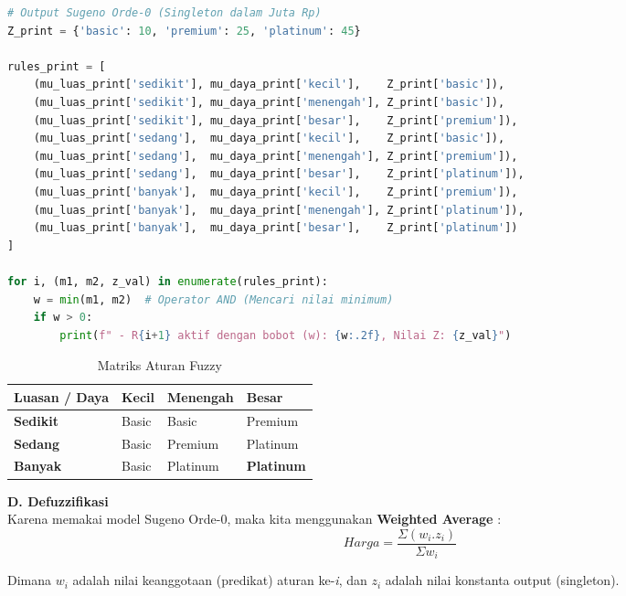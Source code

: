 \documentclass{article}
\begin{document}
\begin{lstlisting}[caption=Membuat Rule Output, language=Python]
# Output Sugeno Orde-0 (Singleton dalam Juta Rp)
Z_print = {'basic': 10, 'premium': 25, 'platinum': 45}

rules_print = [
    (mu_luas_print['sedikit'], mu_daya_print['kecil'],    Z_print['basic']),
    (mu_luas_print['sedikit'], mu_daya_print['menengah'], Z_print['basic']),
    (mu_luas_print['sedikit'], mu_daya_print['besar'],    Z_print['premium']),
    (mu_luas_print['sedang'],  mu_daya_print['kecil'],    Z_print['basic']),
    (mu_luas_print['sedang'],  mu_daya_print['menengah'], Z_print['premium']),
    (mu_luas_print['sedang'],  mu_daya_print['besar'],    Z_print['platinum']),
    (mu_luas_print['banyak'],  mu_daya_print['kecil'],    Z_print['premium']),
    (mu_luas_print['banyak'],  mu_daya_print['menengah'], Z_print['platinum']),
    (mu_luas_print['banyak'],  mu_daya_print['besar'],    Z_print['platinum'])
]

for i, (m1, m2, z_val) in enumerate(rules_print):
    w = min(m1, m2)  # Operator AND (Mencari nilai minimum)
    if w > 0:
        print(f" - R{i+1} aktif dengan bobot (w): {w:.2f}, Nilai Z: {z_val}")
\end{lstlisting}

\begin{table}[h!]
\centering
\caption{Matriks Aturan Fuzzy}
\begin{tabular}{llll}
\hline
\textbf{Luasan / Daya} & \textbf{Kecil} & \textbf{Menengah} & \textbf{Besar}\\ \hline
\textbf{Sedikit}    & Basic     & Basic     & Premium     \\
\textbf{Sedang}     & Basic     & Premium   & Platinum     \\
\textbf{Banyak}     & Basic     & Platinum  & \textbf{Platinum}    \\ \hline
\end{tabular}
\label{tab:dummy_table} %
\end{table}

\textbf{D. Defuzzifikasi}\\
Karena memakai model Sugeno Orde-0, maka kita menggunakan \textbf{Weighted Average} : \\
\[
        Harga = \frac{\Sigma (w_{i} . z_{i})}{\Sigma w_{i}}
\]

Dimana $w_{i}$ adalah nilai keanggotaan (predikat) aturan ke-\textit{i}, dan $z_{i}$ adalah nilai konstanta output (singleton).
\end{document}
